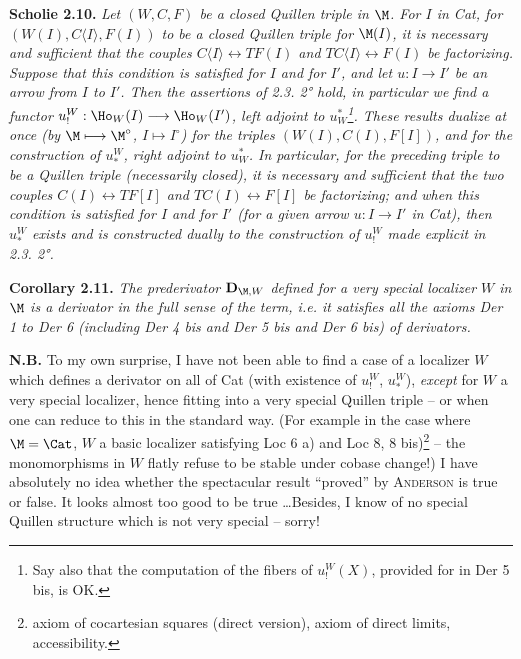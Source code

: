 
\textbf{Scholie 2.10.} \textit{Let $(W,C,F)$ be a closed Quillen triple in $\M$. For $I$ in \textup{Cat}, for $(W(I),C\langle I\rangle,F(I))$ to be a closed Quillen triple for $\M(I)$, it is necessary and sufficient that the couples $C\langle I\rangle\longleftrightarrow TF(I)$ and $TC\langle I\rangle\longleftrightarrow F(I)$ be factorizing. Suppose that this condition is satisfied for $I$ and for $I'$, and let $u : I\longrightarrow I'$ be an arrow from $I$ to $I'$. Then the assertions of \textup{2.3. 2°} hold, in particular we find a functor $u^{W}_{!} : \Ho_W(I)\longrightarrow\Ho_W(I')$, left adjoint to $u^{*}_{W}$\footnote[18]{Say also that the computation of the fibers of $u^{W}_{!}(X)$, provided for in Der 5 bis, is OK.}. These results dualize at once (by $\M\longmapsto\M^{\circ}$, $I\longmapsto I^{\circ}$) for the triples $(W(I),C(I),F[I])$, and for the construction of $u^{W}_{*}$, right adjoint to $u^{*}_{W}$. In particular, for the preceding triple to be a Quillen triple (necessarily closed), it is necessary and sufficient that the two couples $C(I)\longleftrightarrow TF[I]$ and $TC(I)\longleftrightarrow F[I]$ be factorizing; and when this condition is satisfied for $I$ and for $I'$ (for a given arrow $u : I\longrightarrow I'$ in \textup{Cat}), then $u^{W}_{*}$ exists and is constructed dually to the construction of $u^{W}_{!}$ made explicit in \textup{2.3. 2°}.}

\textbf{Corollary 2.11.} \textit{The prederivator $\mathbf{D}_{\M,W}$ defined for a \textup{very special} localizer $W$ in $\M$ is a derivator in the full sense of the term, i.e. it satisfies all the axioms Der 1 to Der 6 (including Der 4 bis and Der 5 bis and Der 6 bis) of derivators.}

\textbf{N.B.} To my own surprise, I have not been able to find a case of a localizer $W$ which defines a derivator on all of Cat (with existence of $u^{W}_{!}$, $u^{W}_{*}$), \textit{except} for $W$ a very special localizer, hence fitting into a very special Quillen triple -- or when one can reduce to this in the standard way. (For example in the case where $\M=\Cat$, $W$ a basic localizer satisfying Loc 6 a) and Loc 8, 8 bis)\footnote[19]{axiom of cocartesian squares (direct version), axiom of direct limits, accessibility.} -- the monomorphisms in $W$ flatly refuse to be stable under cobase change!) I have absolutely no idea whether the spectacular result ``proved'' by \textsc{Anderson} is true or false. It looks almost too good to be true \ldots{}Besides, I know of no special Quillen structure which is not very special -- sorry! %


